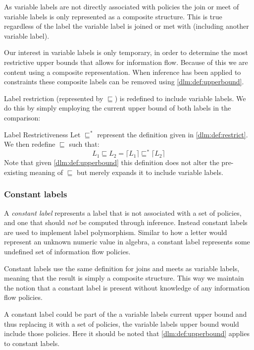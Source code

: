 As variable labels are not directly associated with policies the join or meet of variable labels is only represented as a composite structure.
This is true regardless of the label the variable label is joined or met with (including another variable label).

Our interest in variable labels is only temporary, in order to determine the most restrictive upper bounds that allows for information flow.
Because of this we are content using a composite representation.
When inference has been applied to constraints these composite labels can be removed using \cref{dlm:def:upperbound}.

Label restriction (represented by $\sqsubseteq$) is redefined to include variable labels.
We do this by simply employing the current upper bound of both labels in the comparison:
\begin{definition}{Label Restrictiveness}\label{dlm:def:restrictupperbound}
  Let $\sqsubseteq^*$ represent the definition given in \cref{dlm:def:restrict}.
  We then redefine $\sqsubseteq$ such that:
  \[
    L_1 \sqsubseteq L_2 = \lceil L_1 \rceil \sqsubseteq^* \lceil L_2 \rceil
  \]
  Note that given \cref{dlm:def:upperbound} this definition does not alter the pre-existing meaning of $\sqsubseteq$ but merely expands it to include variable labels.
\end{definition}

\subsubsection{Constant labels}
A \textit{constant label} represents a label that is not associated with a set of policies, and one that should \textit{not} be computed through inference.
Instead constant labels are used to implement label polymorphism.
Similar to how a letter would represent an unknown numeric value in algebra, a constant label represents some undefined set of information flow policies.

Constant labels use the same definition for joins and meets as variable labels, meaning that the result is simply a composite structure.
This way we maintain the notion that a constant label is present without knowledge of any information flow policies.

A constant label could be part of the a variable labels current upper bound and thus replacing it with a set of policies, the variable labels upper bound would include those policies.
Here it should be noted that \cref{dlm:def:upperbound} applies to constant labels.

